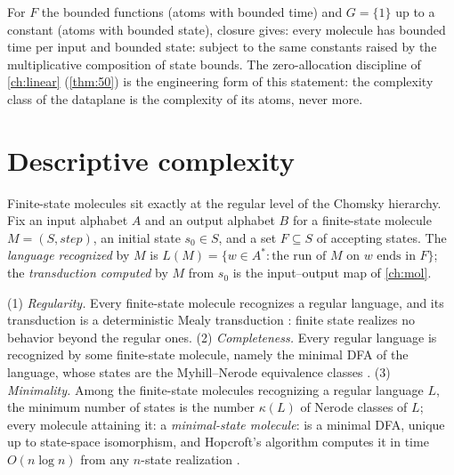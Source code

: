 \begin{remark}
For $F$ the bounded functions (atoms with bounded time) and $G = \{1\}$ up to
a constant (atoms with bounded state), closure gives: every molecule has
bounded time per input and bounded state: subject to the same constants
raised by the multiplicative composition of state bounds. The zero-allocation
discipline of \autoref{ch:linear} (\autoref{thm:50}) is the engineering form of this
statement: the complexity class of the dataplane is the complexity of its
atoms, never more.
\end{remark}

\section{Descriptive complexity}\label{sec:enrich-descriptive}

Finite-state molecules sit exactly at the regular level of the Chomsky
hierarchy. Fix an input alphabet $A$ and an output alphabet $B$ for a
finite-state molecule $M = (S, \mathit{step})$, an initial state $s_0 \in S$,
and a set $F \subseteq S$ of accepting states. The \emph{language recognized}
by $M$ is $L (M) = \{w \in A^{*} : \text{the run of } M \text{ on } w \text{ ends
in } F\}$; the \emph{transduction computed} by $M$ from $s_0$ is the
input--output map of \autoref{ch:mol}.

\begin{theorem}\label{thm:31}
 (1) \emph{Regularity.} Every finite-state molecule
recognizes a regular language, and its transduction is a deterministic Mealy
transduction \cite{mealy}: finite state realizes no behavior beyond the
regular ones.
(2) \emph{Completeness.} Every regular language is recognized by some
finite-state molecule, namely the minimal DFA of the language, whose states
are the Myhill--Nerode equivalence classes \cite{nerode}.
(3) \emph{Minimality.} Among the finite-state molecules recognizing a regular
language $L$, the minimum number of states is the number $\kappa (L)$ of Nerode
classes of $L$; every molecule attaining it: a \emph{minimal-state
molecule}: is a minimal DFA, unique up to state-space isomorphism, and
Hopcroft's algorithm computes it in time $O (n \log n)$ from any $n$-state
realization \cite{hopcroft}.
\end{theorem}

